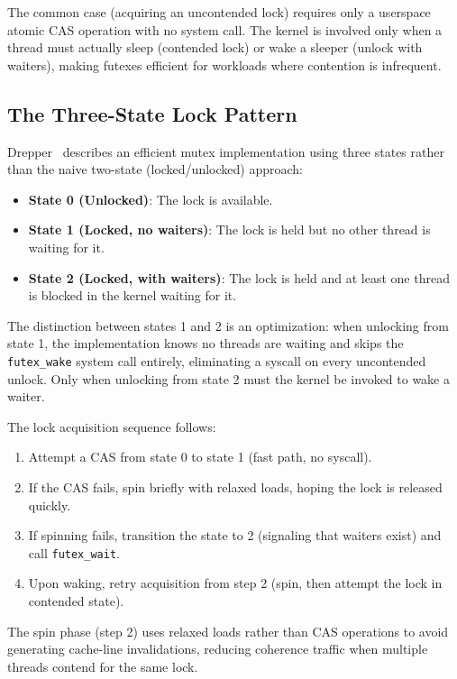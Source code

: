 The common case (acquiring an uncontended lock) requires only a userspace atomic CAS operation with no system call. The kernel is involved only when a thread must actually sleep (contended lock) or wake a sleeper (unlock with waiters), making futexes efficient for workloads where contention is infrequent.

\subsection{The Three-State Lock Pattern}

Drepper~\cite{drepper2005} describes an efficient mutex implementation using three states rather than the naive two-state (locked/unlocked) approach:

\begin{itemize}
    \item \textbf{State 0 (Unlocked)}: The lock is available.
    \item \textbf{State 1 (Locked, no waiters)}: The lock is held but no other thread is waiting for it.
    \item \textbf{State 2 (Locked, with waiters)}: The lock is held and at least one thread is blocked in the kernel waiting for it.
\end{itemize}

The distinction between states 1 and 2 is an optimization: when unlocking from state 1, the implementation knows no threads are waiting and skips the \texttt{futex\_wake} system call entirely, eliminating a syscall on every uncontended unlock. Only when unlocking from state 2 must the kernel be invoked to wake a waiter.

The lock acquisition sequence follows:

\begin{enumerate}
    \item Attempt a CAS from state 0 to state 1 (fast path, no syscall).
    \item If the CAS fails, spin briefly with relaxed loads, hoping the lock is released quickly.
    \item If spinning fails, transition the state to 2 (signaling that waiters exist) and call \texttt{futex\_wait}.
    \item Upon waking, retry acquisition from step 2 (spin, then attempt the lock in contended state).
\end{enumerate}

The spin phase (step 2) uses relaxed loads rather than CAS operations to avoid generating cache-line invalidations, reducing coherence traffic when multiple threads contend for the same lock.

